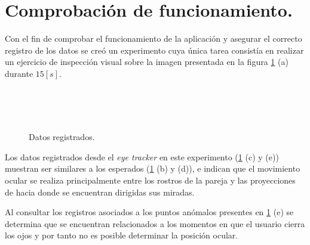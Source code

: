 \documentclass[\main/Main.tex]{subfiles}
\begin{document}
    \section{Comprobación de funcionamiento.}
    \label{sec:04_funcionamiento}
        Con el fin de comprobar el funcionamiento de la aplicación y asegurar el correcto registro de los datos se creó un experimento cuya única tarea consistía en realizar un ejercicio de inspección visual sobre la imagen presentada en la figura \ref{fig:04_frame_result} (a) durante $15[s]$. 
        \begin{figure}[H]
            \centering
            \\
            \hspace{5mm}
            \\
            \hspace{5mm}
            \\
            \caption{Datos registrados.}
            \label{fig:04_frame_result}
        \end{figure}

        Los datos registrados desde el \textit{eye tracker} en este experimento (\ref{fig:04_frame_result} (c) y (e)) muestran ser similares a los esperados (\ref{fig:04_frame_result} (b) y (d)), e indican que el movimiento ocular se realiza principalmente entre los rostros de la pareja y las proyecciones de hacia donde se encuentran dirigidas sus miradas. 

        \newpage
        Al consultar los registros asociados a los puntos anómalos presentes en \ref{fig:04_frame_result} (e) se determina que se encuentran relacionados a los momentos en que el usuario cierra los ojos y por tanto no es posible determinar la posición ocular.    
\end{document}
